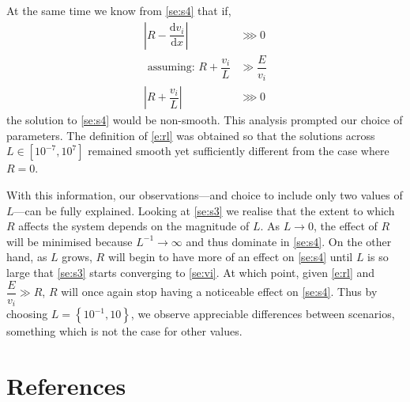 \documentclass[aip,apl,reprint]{revtex4-1}
\newcommand{\difx}[1]{\dfrac{\mathrm{d}#1}{\mathrm{d}x}}
\begin{document}
	At the same time we know from \cref{se:s4} that if,
	\begin{subequations}
		\begin{align}
			\left|R - \difx{v_{i}}\right| &\ggg 0 \\
			\textrm{ assuming: } R + \dfrac{v_{i}}{L} &\gg \dfrac{E}{v_{i}} \nonumber \\
			\left|R + \dfrac{v_{i}}{L}\right| &\ggg 0
		\end{align}
	\end{subequations}
	the solution to \cref{se:s4} would be non-smooth. This analysis prompted our choice of parameters. The definition of \cref{e:rl} was obtained so that the solutions across $L \in [10^{-7}, 10^{7}]$ remained smooth yet sufficiently different from the case where $R = 0$.
	
	With this information, our observations---and choice to include only two values of $L$---can be fully explained. Looking at \cref{se:s3} we realise that the extent to which $R$ affects the system depends on the magnitude of $L$. As $L \to 0$, the effect of $R$ will be minimised because $L^{-1} \to \infty$ and thus dominate in \cref{se:s4}. On the other hand, as $L$ grows, $R$ will begin to have more of an effect on \cref{se:s4} until $L$ is so large that \cref{se:s3} starts converging to \cref{se:vi}. At which point, given \cref{e:rl} and $\dfrac{E}{v_{i}} \gg R$, $R$ will once again stop having a noticeable effect on \cref{se:s4}. Thus by choosing $L = \left\{10^{-1}, 10\right\}$, we observe appreciable differences between scenarios, something which is not the case for other values.

	
	\section{References}
	

	
\end{document}
